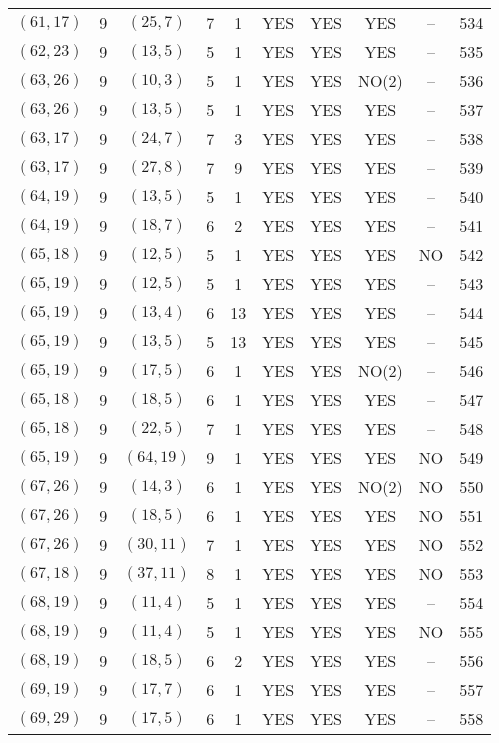\begin{longtable}{|c|c|c|c|c|c|c|c|c|c|}
$(61, 17)$ & 9 & $(25, 7)$ & 7 & 1 & YES & YES & YES & -- & 534\\
$(62, 23)$ & 9 & $(13, 5)$ & 5 & 1 & YES & YES & YES & -- & 535\\
$(63, 26)$ & 9 & $(10, 3)$ & 5 & 1 & YES & YES & NO(2) & -- & 536\\
$(63, 26)$ & 9 & $(13, 5)$ & 5 & 1 & YES & YES & YES & -- & 537\\
$(63, 17)$ & 9 & $(24, 7)$ & 7 & 3 & YES & YES & YES & -- & 538\\
$(63, 17)$ & 9 & $(27, 8)$ & 7 & 9 & YES & YES & YES & -- & 539\\
$(64, 19)$ & 9 & $(13, 5)$ & 5 & 1 & YES & YES & YES & -- & 540\\
$(64, 19)$ & 9 & $(18, 7)$ & 6 & 2 & YES & YES & YES & -- & 541\\
$(65, 18)$ & 9 & $(12, 5)$ & 5 & 1 & YES & YES & YES & NO & 542\\
$(65, 19)$ & 9 & $(12, 5)$ & 5 & 1 & YES & YES & YES & -- & 543\\
$(65, 19)$ & 9 & $(13, 4)$ & 6 & 13 & YES & YES & YES & -- & 544\\
$(65, 19)$ & 9 & $(13, 5)$ & 5 & 13 & YES & YES & YES & -- & 545\\
$(65, 19)$ & 9 & $(17, 5)$ & 6 & 1 & YES & YES & NO(2) & -- & 546\\
$(65, 18)$ & 9 & $(18, 5)$ & 6 & 1 & YES & YES & YES & -- & 547\\
$(65, 18)$ & 9 & $(22, 5)$ & 7 & 1 & YES & YES & YES & -- & 548\\
$(65, 19)$ & 9 & $(64, 19)$ & 9 & 1 & YES & YES & YES & NO & 549\\
$(67, 26)$ & 9 & $(14, 3)$ & 6 & 1 & YES & YES & NO(2) & NO & 550\\
$(67, 26)$ & 9 & $(18, 5)$ & 6 & 1 & YES & YES & YES & NO & 551\\
$(67, 26)$ & 9 & $(30, 11)$ & 7 & 1 & YES & YES & YES & NO & 552\\
$(67, 18)$ & 9 & $(37, 11)$ & 8 & 1 & YES & YES & YES & NO & 553\\
$(68, 19)$ & 9 & $(11, 4)$ & 5 & 1 & YES & YES & YES & -- & 554\\
$(68, 19)$ & 9 & $(11, 4)$ & 5 & 1 & YES & YES & YES & NO & 555\\
$(68, 19)$ & 9 & $(18, 5)$ & 6 & 2 & YES & YES & YES & -- & 556\\
$(69, 19)$ & 9 & $(17, 7)$ & 6 & 1 & YES & YES & YES & -- & 557\\
$(69, 29)$ & 9 & $(17, 5)$ & 6 & 1 & YES & YES & YES & -- & 558\\

\end{longtable}
